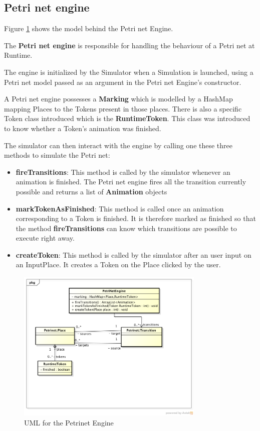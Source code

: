 \subsection{Petri net engine}

Figure \ref{fig:uml-petrinet-engine} shows the model behind the Petri net Engine.

The \textbf{Petri net engine} is responsible for handling the behaviour of a Petri net at Runtime. 

The engine is initialized by the Simulator when a Simulation is launched, using a Petri net model passed as an argument in the Petri net Engine's constructor.

A Petri net engine possesses a \textbf{Marking} which is modelled by a HashMap mapping Places to the Tokens present in those places.
There is also a specific Token class introduced which is the \textbf{RuntimeToken}. This class was introduced to know whether a Token's animation was finished. 

The simulator can then interact with the engine by calling one these three methods to simulate the Petri net:

\begin{itemize}
  \item \textbf{fireTransitions}: This method is called by the simulator whenever an animation is finished. The Petri net engine fires all the transition currently possible and returns a list of \textbf{Animation} objects
  \item \textbf{markTokenAsFinished}: This method is called once an animation corresponding to a Token is finished. It is therefore marked as finished so that the method \textbf{fireTransitions} can know which transitions are possible to execute right away.
  \item \textbf{createToken}: This method is called by the simulator after an user input on an InputPlace. It creates a Token on the Place clicked by the user.
\end{itemize}
 
\begin{figure}[htp]
\begin{center}
  \includegraphics[width=0.8\textwidth]{image/petrinet_engine.png}
  \caption{UML for the Petrinet Engine}
  \label{fig:uml-petrinet-engine}
\end{center}
\end{figure}


 

